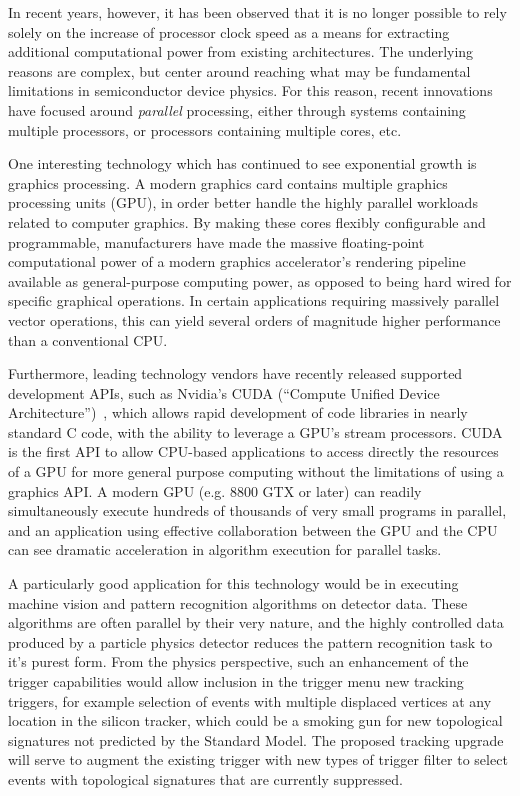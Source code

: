 \documentclass{JINST}
\begin{document}
In recent years, however, it has been observed that it is no longer possible to rely solely on the increase
of processor clock speed as a means for extracting additional computational power from existing architectures.
The underlying reasons are complex, but center around reaching what may be fundamental limitations in
semiconductor device physics.  For this reason, recent innovations have focused around {\em parallel}
processing, either through systems containing multiple processors, or processors containing multiple cores, etc.

One interesting technology which has continued to see exponential growth is graphics processing.  A modern graphics
card contains multiple graphics processing units (GPU), in order better handle the highly parallel workloads
related to computer graphics.  By making these cores flexibly configurable and programmable, manufacturers have made
the massive floating-point computational power of a modern graphics
accelerator's rendering pipeline available as general-purpose computing power,
as opposed to being hard wired for specific
graphical operations.  In certain applications requiring massively parallel vector operations, this can yield several 
orders of magnitude higher performance than a conventional CPU.


Furthermore, leading technology vendors have recently released supported development APIs, such as Nvidia's
CUDA (``Compute Unified Device Architecture'')~\cite{bib:CUDA}, which allows rapid development of
code libraries in nearly standard C code, with the ability to leverage a GPU's stream processors.
CUDA is the first API to allow CPU-based applications to access directly the resources of a GPU 
for more general purpose computing without the limitations of using a graphics API.
 A modern GPU (e.g. 8800 GTX or later) can readily simultaneously execute hundreds of thousands of very 
small programs in parallel, and an application using effective collaboration between the GPU and the CPU can see
dramatic acceleration in algorithm execution for parallel tasks.

A particularly good application for this technology would be in executing machine vision
and pattern recognition algorithms on detector data.  These algorithms are often parallel
by their very nature, and the highly controlled data produced by a particle physics detector
reduces the pattern recognition task to it's purest form.  From the physics perspective,
such an enhancement of the trigger capabilities would allow inclusion in the
trigger menu new tracking triggers, for example selection of events with multiple displaced
vertices at any location in the silicon tracker, which could be a smoking gun for new topological
signatures not predicted by the Standard Model.  The proposed tracking upgrade will serve to
augment the existing trigger with new types of trigger filter to select events with topological signatures
that are currently suppressed. 
\end{document}

